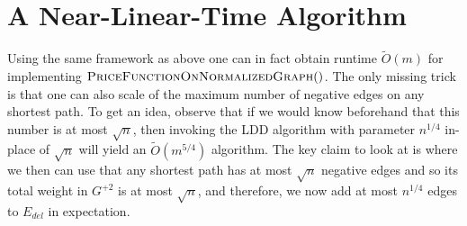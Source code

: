 \section{A Near-Linear-Time Algorithm}

Using the same framework as above one can in fact obtain runtime $\tilde{O}(m)$ for implementing  $\textsc{PriceFunctionOnNormalizedGraph}()$. The only missing trick is that one can also scale of the maximum number of negative edges on any shortest path. To get an idea, observe that if we would know beforehand that this number is at most $\sqrt{n}$, then invoking the LDD algorithm with parameter $n^{1/4}$ in-place of $\sqrt{n}$ will yield an $\tilde{O}(m^{5/4})$ algorithm. The key claim to look at is  where we then can use that any shortest path has at most $\sqrt{n}$ negative edges and so its total weight in $G^{+2}$ is at most $\sqrt{n}$, and therefore, we now add at most $n^{1/4}$ edges to $E_{del}$ in expectation. 